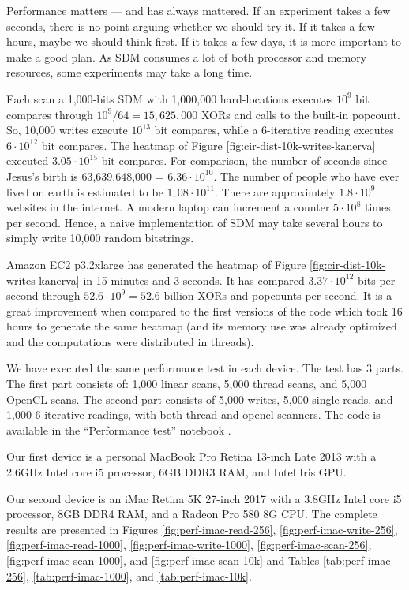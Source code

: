 
Performance matters --- and has always mattered. If an experiment takes a few seconds, there is no point arguing whether we should try it. If it takes a few hours, maybe we should think first. If it takes a few days, it is more important to make a good plan. As SDM consumes a lot of both processor and memory resources, some experiments may take a long time.

Each scan a 1,000-bits SDM with 1,000,000 hard-locations executes $10^9$ bit compares through $10^9/64 = 15,625,000$ XORs and calls to the built-in popcount. So, 10,000 writes execute $10^{13}$ bit compares, while a 6-iterative reading executes $6 \cdot 10^{12}$ bit compares. The heatmap of Figure \ref{fig:cir-dist-10k-writes-kanerva} executed $3.05 \cdot 10^{15}$ bit compares. For comparison, the number of seconds since Jesus's birth is 63,639,648,000 = $6.36 \cdot 10^{10}$. The number of people who have ever lived on earth is estimated to be $1,08 \cdot 10^{11}$. There are approximtely $1.8 \cdot 10^{9}$ websites in the internet. A modern laptop can increment a counter $5 \cdot 10^{8}$ times per second. Hence, a naive implementation of SDM may take several hours to simply write 10,000 random bitstrings.

Amazon EC2 p3.2xlarge has generated the heatmap of Figure \ref{fig:cir-dist-10k-writes-kanerva} in 15 minutes and 3 seconds. It has compared $3.37 \cdot 10^{12}$ bits per second through $52.6 \cdot 10^{9} = 52.6 \text{ billion}$ XORs and popcounts per second. It is a great improvement when compared to the first versions of the code which took 16 hours to generate the same heatmap (and its memory use was already optimized and the computations were distributed in threads).

We have executed the same performance test in each device. The test has 3 parts. The first part consists of: 1,000 linear scans, 5,000 thread scans, and 5,000 OpenCL scans. The second part consists of 5,000 writes, 5,000 single reads, and 1,000 6-iterative readings, with both thread and opencl scanners. The code is available in the ``Performance test'' notebook \citep{sdmframework}.

Our first device is a personal MacBook Pro Retina 13-inch Late 2013 with a 2.6GHz Intel core i5 processor, 6GB DDR3 RAM, and Intel Iris GPU.

Our second device is an iMac Retina 5K 27-inch 2017 with a 3.8GHz Intel core i5 processor, 8GB DDR4 RAM, and a Radeon Pro 580 8G CPU. The complete results are presented in Figures \ref{fig:perf-imac-read-256}, \ref{fig:perf-imac-write-256}, \ref{fig:perf-imac-read-1000}, \ref{fig:perf-imac-write-1000}, \ref{fig:perf-imac-scan-256}, \ref{fig:perf-imac-scan-1000}, and \ref{fig:perf-imac-scan-10k} and Tables \ref{tab:perf-imac-256}, \ref{tab:perf-imac-1000}, and \ref{tab:perf-imac-10k}.

